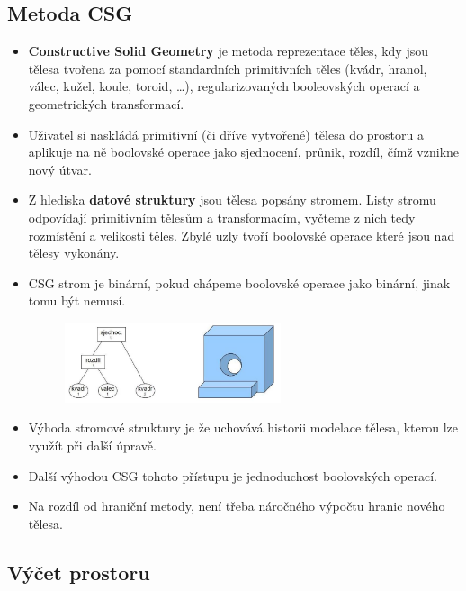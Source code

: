  \subsection{Metoda CSG}
 \begin{itemize}
 	\item \textbf{Constructive Solid Geometry} je metoda reprezentace těles, kdy jsou tělesa tvořena za pomocí standardních primitivních těles (kvádr, hranol, válec, kužel, koule, toroid, …), regularizovaných booleovských operací a geometrických transformací.
	\item Uživatel si naskládá primitivní (či dříve vytvořené) tělesa do prostoru a aplikuje na ně boolovské operace jako sjednocení, průnik, rozdíl, čímž vznikne nový útvar.
	\item Z hlediska \textbf{datové struktury} jsou tělesa popsány stromem. Listy stromu odpovídají primitivním tělesům a transformacím, vyčteme z nich tedy rozmístění a velikosti těles. Zbylé uzly tvoří boolovské operace které jsou nad tělesy vykonány.
	\item CSG strom je binární, pokud chápeme boolovské operace jako binární, jinak tomu být nemusí.
		\begin{figure}[H]
		\centering
		\includegraphics[width=0.6\textwidth]{assets/4_csg}
		\end{figure}
 	\item Výhoda stromové struktury je že uchovává historii modelace tělesa, kterou lze využít při další úpravě.
 	\item Další výhodou CSG tohoto přístupu je jednoduchost boolovských operací.
 	\item Na rozdíl od hraniční metody, není třeba náročného výpočtu hranic nového tělesa.
 \end{itemize}

 \subsection{Výčet prostoru}
